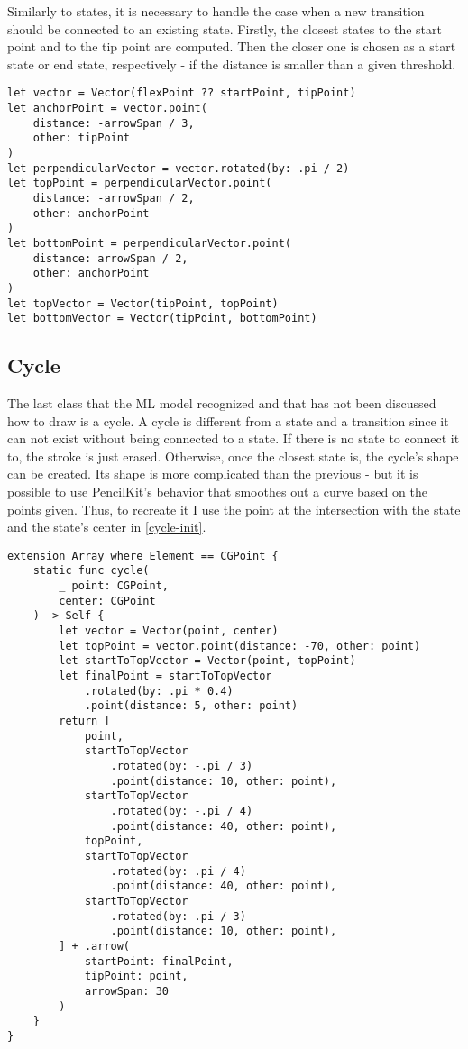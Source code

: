 Similarly to states, it is necessary to handle the case when a new transition should be connected to an existing state. Firstly, the closest states to the start point and to the tip point are computed. Then the closer one is chosen as a start state or end state, respectively - if the distance is smaller than a given threshold.

\begin{lstlisting}[caption={Computation of top and bottom points, vectors}, label=transition-points]
let vector = Vector(flexPoint ?? startPoint, tipPoint)
let anchorPoint = vector.point(
    distance: -arrowSpan / 3, 
    other: tipPoint
)
let perpendicularVector = vector.rotated(by: .pi / 2)
let topPoint = perpendicularVector.point(
    distance: -arrowSpan / 2,
    other: anchorPoint
)
let bottomPoint = perpendicularVector.point(
    distance: arrowSpan / 2,
    other: anchorPoint
)
let topVector = Vector(tipPoint, topPoint)
let bottomVector = Vector(tipPoint, bottomPoint)
\end{lstlisting}

\subsection{Cycle}

The last class that the ML model recognized and that has not been discussed how to draw is a cycle. A cycle is different from a state and a transition since it can not exist without being connected to a state. If there is no state to connect it to, the stroke is just erased. Otherwise, once the closest state is, the cycle's shape can be created. Its shape is more complicated than the previous - but it is possible to use PencilKit's behavior that smoothes out a curve based on the points given. Thus, to recreate it I use the point at the intersection with the state and the state's center in \ref{cycle-init}.

\begin{lstlisting}[caption=Cycle stroke, label=cycle-init]
extension Array where Element == CGPoint {
    static func cycle(
        _ point: CGPoint,
        center: CGPoint
    ) -> Self {
        let vector = Vector(point, center)
        let topPoint = vector.point(distance: -70, other: point)
        let startToTopVector = Vector(point, topPoint)
        let finalPoint = startToTopVector
            .rotated(by: .pi * 0.4)
            .point(distance: 5, other: point)
        return [
            point,
            startToTopVector
                .rotated(by: -.pi / 3)
                .point(distance: 10, other: point),
            startToTopVector
                .rotated(by: -.pi / 4)
                .point(distance: 40, other: point),
            topPoint,
            startToTopVector
                .rotated(by: .pi / 4)
                .point(distance: 40, other: point),
            startToTopVector
                .rotated(by: .pi / 3)
                .point(distance: 10, other: point),
        ] + .arrow(
            startPoint: finalPoint,
            tipPoint: point,
            arrowSpan: 30
        )
    }
}
\end{lstlisting}

